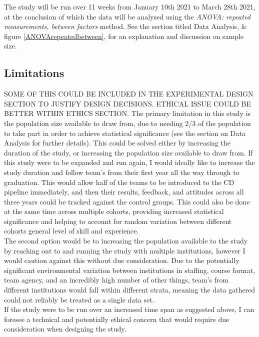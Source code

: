 \documentclass[journal]{IEEEtran}
\begin{document}
The study will be run over 11 weeks from January 10th 2021 to March 28th 2021, at the conclusion of which the data will be analysed using the \textit{ANOVA: repeated measurements, between factors} method. See the section titled Data Analysis, \& figure \ref{ANOVArepeatedbetween}, for an explanation and discussion on sample size.

\subsection{Limitations}
SOME OF THIS COULD BE INCLUDED IN THE EXPERIMENTAL DESIGN SECTION TO JUSTIFY DESIGN DECISIONS. ETHICAL ISSUE COULD BE BETTER WITHIN ETHICS SECTION. 
The primary limitation in this study is the population size available to draw from, due to needing 2/3 of the population to take part in order to achieve statistical significance (see the section on Data Analysis for further details). This could be solved either by increasing the duration of the study, or increasing the population size available to draw from. If this study were to be expanded and run again, I would ideally like to increase the study duration and follow team's from their first year all the way through to graduation. This would allow half of the teams to be introduced to the CD pipeline immediately, and then their results, feedback, and attitudes across all three years could be tracked against the control groups. This could also be done at the same time across multiple cohorts, providing increased statistical significance and helping to account for random variation between different cohorts general level of skill and experience. \\
The second option would be to  increasing the population available to the study by reaching out to and running the study with multiple institutions, however I would caution against this without due consideration. Due to the potentially significant environmental variation between institutions in staffing, course format, team agency, and an incredibly high number of other things, team's from different institutions would fall within different strata, meaning the data gathered could not reliably be treated as a single data set. \\
If the study were to be run over an increased time span as suggested above, I can foresee a technical and potentially ethical concern that would require due consideration when designing the study.
\end{document}
